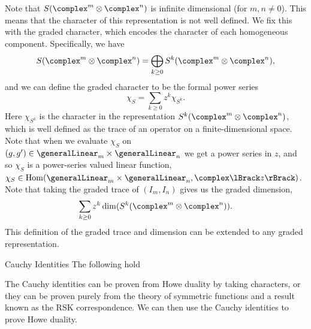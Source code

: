 \documentclass[fleqn]{NotesClass}
\DeclareMathOperator{\Hom}{Hom}
\begin{document}
    Note that \(S(\complex^m \otimes \complex^n)\) is infinite dimensional (for \(m, n \ne 0\)).
    This means that the character of this representation is not well defined.
    We fix this with the graded character, which encodes the character of each homogeneous component.
    Specifically, we have
    \begin{equation}
        S(\complex^m \otimes \complex^n) = \bigoplus_{k \ge 0} S^k(\complex^m \otimes \complex^n),
    \end{equation}
    and we can define the graded character to be the formal power series
    \begin{equation}
        \chi_S = \sum_{k \ge 0} z^k \chi_{S^k}.
    \end{equation}
    Here \(\chi_{S^k}\) is the character in the representation \(S^k(\complex^m \otimes \complex^n)\), which is well defined as the trace of an operator on a finite-dimensional space.
    Note that when we evaluate \(\chi_S\) on \((g, g') \in \generalLinear_m \times \generalLinear_n\) we get a power series in \(z\), and so \(\chi_S\) is a power-series valued linear function, \(\chi_S \in \Hom(\generalLinear_m \times \generalLinear_n, \complex \lBrack z \rBrack)\).
    Note that taking the graded trace of \((I_m, I_n)\) gives us the graded dimension,
    \begin{equation}
        \sum_{k \ge 0} z^k \dim(S^k(\complex^m \otimes \complex^n)).
    \end{equation}
    This definition of the graded trace and dimension can be extended to any graded representation.
    
    \begin{prp}{Cauchy Identities}{}
        The following hold
    \end{prp}
    
    The Cauchy identities can be proven from Howe duality by taking characters, or they can be proven purely from the theory of symmetric functions and a result known as the RSK correspondence.
    We can then use the Cauchy identities to prove Howe duality.
    
\end{document}
